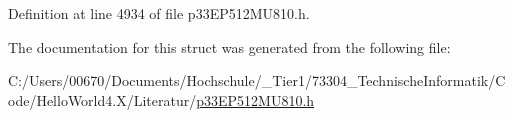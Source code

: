 Definition at line 4934 of file p33\+E\+P512\+M\+U810.\+h.



The documentation for this struct was generated from the following file\+:\begin{DoxyCompactItemize}
\item 
C\+:/\+Users/00670/\+Documents/\+Hochschule/\+\_\+\+Tier1/73304\+\_\+\+Technische\+Informatik/\+Code/\+Hello\+World4.\+X/\+Literatur/\hyperlink{p33_e_p512_m_u810_8h}{p33\+E\+P512\+M\+U810.\+h}\end{DoxyCompactItemize}
